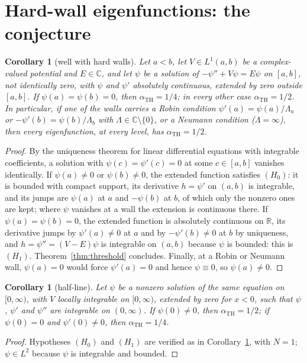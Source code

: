 \documentclass[11pt,a4paper]{article}
\newtheorem{corollary}[theorem]{Corollary}
\theoremstyle{definition}
\theoremstyle{plain}
\newcommand{\R}{\mathbb{R}}
\newcommand{\C}{\mathbb{C}}
\newcommand{\aTH}{\alpha_{\mathrm{TH}}}
\begin{document}
\section{Hard-wall eigenfunctions: the conjecture}
\begin{corollary}[well with hard walls]\label{cor:well}
Let $a<b$, let $V\in L^1(a,b)$ be a complex-valued potential and $E\in\C$, and
let $\psi$ be a solution of $-\psi''+V\psi=E\psi$ on $[a,b]$, not identically
zero, with $\psi$ and $\psi'$ absolutely continuous, extended by zero outside
$[a,b]$. If $\psi(a)=\psi(b)=0$, then $\aTH=1/4$; in every other case
$\aTH=1/2$. In particular, if one of the walls carries a Robin condition
$\psi'(a)=\psi(a)/\Lambda_a$ or $-\psi'(b)=\psi(b)/\Lambda_b$ with
$\Lambda\in\C\setminus\{0\}$, or a Neumann condition ($\Lambda=\infty$), then
every eigenfunction, at every level, has $\aTH=1/2$.
\end{corollary}

\begin{proof}
By the uniqueness theorem for linear differential equations with integrable
coefficients, a solution with $\psi(c)=\psi'(c)=0$ at some $c\in[a,b]$
vanishes identically. If $\psi(a)\neq0$ or $\psi(b)\neq0$, the extended
function satisfies $(H_0)$: it is bounded with compact support, its derivative
$h=\psi'$ on $(a,b)$ is integrable, and its jumps are $\psi(a)$ at $a$ and
$-\psi(b)$ at $b$, of which only the nonzero ones are kept; where $\psi$
vanishes at a wall the extension is continuous there. If $\psi(a)=\psi(b)=0$,
the extended function is absolutely continuous on $\R$, its derivative jumps
by $\psi'(a)\ne0$ at $a$ and by $-\psi'(b)\neq0$ at $b$ by uniqueness, and
$h=\psi''=(V-E)\psi$ is integrable on $(a,b)$ because $\psi$ is bounded: this
is $(H_1)$. Theorem~\ref{thm:threshold} concludes. Finally, at a Robin or
Neumann wall, $\psi(a)=0$ would force $\psi'(a)=0$ and hence $\psi\equiv0$, so
$\psi(a)\neq0$.
\end{proof}

\begin{corollary}[half-line]\label{cor:half}
Let $\psi$ be a nonzero solution of the same equation on $[0,\infty)$, with
$V$ locally integrable on $[0,\infty)$, extended by zero for $x<0$, such that
$\psi$, $\psi'$ and $\psi''$ are integrable on $(0,\infty)$. If
$\psi(0)\neq0$, then $\aTH=1/2$; if $\psi(0)=0$ and $\psi'(0)\neq0$, then
$\aTH=1/4$.
\end{corollary}

\begin{proof}
Hypotheses $(H_0)$ and $(H_1)$ are verified as in Corollary~\ref{cor:well},
with $N=1$; $\psi\in L^2$ because $\psi$ is integrable and bounded.
\end{proof}
\end{document}
